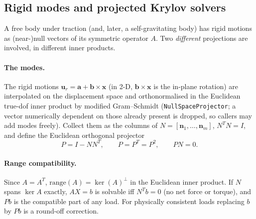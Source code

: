 \documentclass[11pt]{article}
\numberwithin{equation}{section}
\theoremstyle{remark}
\newcommand{\vu}{\mathbf{u}}
\newcommand{\vx}{\mathbf{x}}
\newcommand{\code}[1]{\texttt{#1}}
\begin{document}
\subsection{Rigid modes and projected Krylov solvers}
\label{sec:projected}

A free body under traction (and, later, a self-gravitating body) has
rigid motions as (near-)null vectors of its symmetric operator $A$. Two
\emph{different} projections are involved, in different inner products.

\paragraph{The modes.} The rigid motions $\vu_r = \mathbf{a} +
\mathbf{b}\times\vx$ (in 2-D, $\mathbf{b}\times\vx$ is the in-plane
rotation) are interpolated on the displacement space and orthonormalised
in the Euclidean true-dof inner product by modified Gram--Schmidt
(\code{NullSpaceProjector}; a vector numerically dependent on those
already present is dropped, so callers may add modes freely). Collect them
as the columns of $N = [\mathbf{n}_1,\dots,\mathbf{n}_m]$, $N^TN = I$, and
define the Euclidean orthogonal projector
\begin{equation}
  P = I - NN^T, \qquad P = P^T = P^2, \qquad PN = 0 .
  \label{eq:projector}
\end{equation}

\paragraph{Range compatibility.} Since $A = A^T$, $\mathrm{range}(A) =
\ker(A)^\perp$ in the Euclidean inner product. If $N$ spans $\ker A$
exactly, $AX = b$ is solvable iff $N^Tb = 0$ (no net force or torque), and
$Pb$ is the compatible part of any load. For physically consistent loads
replacing $b$ by $Pb$ is a round-off correction.
\end{document}
